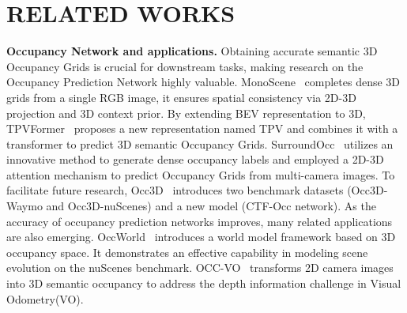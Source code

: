 \section{RELATED WORKS}
\noindent\textbf{Occupancy Network and applications. }Obtaining accurate semantic 3D Occupancy Grids is crucial for downstream tasks, making research on the Occupancy Prediction Network highly valuable\cite{duan2024cellmap}. MonoScene~\cite{cao2022monoscene} completes dense 3D grids from a single RGB image, it ensures spatial consistency via 2D-3D projection and 3D context prior. By extending BEV representation to 3D, TPVFormer~\cite{huang2023tri} proposes a new representation named TPV and combines it with a transformer to predict 3D semantic Occupancy Grids. SurroundOcc~\cite{wei2023surroundocc} utilizes an innovative method to generate dense occupancy labels and employed a 2D-3D attention mechanism to predict Occupancy Grids from multi-camera images. To facilitate future research, Occ3D~\cite{tian2024occ3d} introduces two benchmark datasets (Occ3D-Waymo and Occ3D-nuScenes) and a new model (CTF-Occ network). As the accuracy of occupancy prediction networks improves, many related applications are also emerging. OccWorld~\cite{zheng2023occworld} introduces a world model framework based on 3D occupancy space. It demonstrates an effective capability in modeling scene evolution on the nuScenes benchmark. OCC-VO~\cite{li2024occ} transforms 2D camera images into 3D semantic occupancy to address the depth information challenge in Visual Odometry(VO). 

